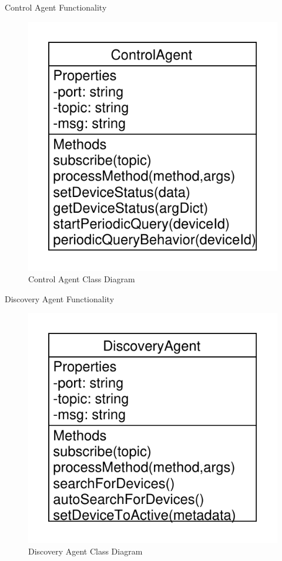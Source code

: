 \documentclass{beamer}
\begin{document}
\begin{frame}{Control Agent Functionality}{}
    \begin{figure}
        \centering
        \includegraphics[scale=0.6]{figs/controlAgentUML.pdf}
        \caption{Control Agent Class Diagram}
        \label{fig:controlAgentClass}
    \end{figure}
\end{frame}

\begin{frame}{Discovery Agent Functionality}{}
    \begin{figure}
        \centering
        \includegraphics[scale=0.6]{figs/discoveryAgentUML.pdf}
        \caption{Discovery Agent Class Diagram}
        \label{fig:discoveryAgentClass}
    \end{figure}
\end{frame}
\end{document}

